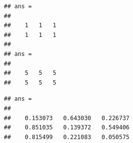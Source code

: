 \documentclass[
]{article}
\newenvironment{Shaded}{\begin{snugshade}}{\end{snugshade}}
\newcommand{\CommentTok}[1]{\textcolor[rgb]{0.56,0.35,0.01}{\textit{#1}}}
\newcommand{\FloatTok}[1]{\textcolor[rgb]{0.00,0.00,0.81}{#1}}
\newcommand{\FunctionTok}[1]{\textcolor[rgb]{0.00,0.00,0.00}{#1}}
\newcommand{\NormalTok}[1]{#1}
\newcommand{\OperatorTok}[1]{\textcolor[rgb]{0.81,0.36,0.00}{\textbf{#1}}}
\begin{document}
\begin{Shaded}
\end{Shaded}

\begin{verbatim}
## ans =
## 
##    1   1   1
##    1   1   1
## 
## ans =
## 
##    5   5   5
##    5   5   5
\end{verbatim}

\begin{Shaded}
\end{Shaded}

\begin{verbatim}
## ans =
## 
##    0.153073   0.643030   0.226737
##    0.851035   0.139372   0.549406
##    0.815499   0.221083   0.050575
\end{verbatim}

\begin{Shaded}
\end{Shaded}
\end{document}
